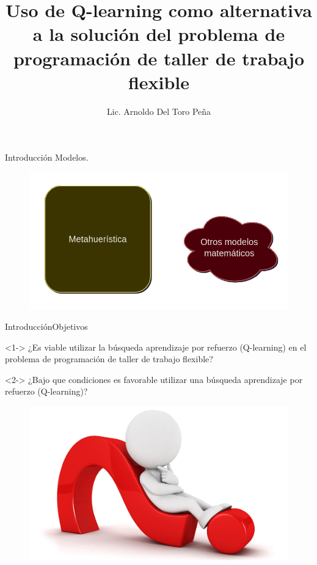 \documentclass{beamer}
\title[UQRSPFS]{Uso de Q-learning como alternativa a la solución del problema de programación de taller de trabajo flexible}
\author{Lic. Arnoldo Del Toro Peña }
\institute[UANL]{Universidad Autónoma de Nuevo León}
\begin{document}
\begin{frame}
 \titlepage
\end{frame}

\begin{frame}{Introducción}
    \centering Modelos.

    \begin{figure}[h!t]
    \centering
    \includegraphics[scale = 0.4 ]{imagen1.png}
    \end{figure}
    
\end{frame}

\begin{frame}{Introducción}{Objetivos}
\begin{block}<1->{}
    ¿Es viable utilizar la búsqueda aprendizaje por refuerzo (Q-learning) en el problema
de programación de taller de trabajo flexible?
\end{block}
\begin{block}<2->{}
	¿Bajo que
condiciones es favorable utilizar una búsqueda aprendizaje por refuerzo (Q-learning)?
\end{block}
\begin{figure}
	\includegraphics[scale = 0.5]{preguntas}
\end{figure}
\end{frame}
\end{document}
